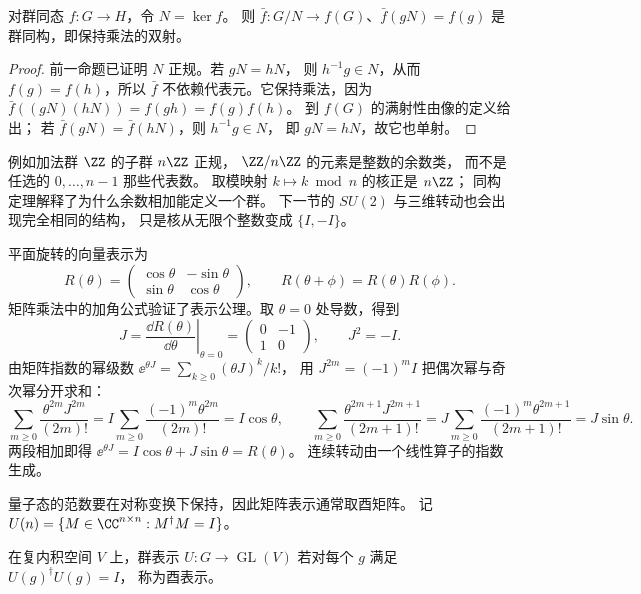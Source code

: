 \begin{theorem}[同态的第一同构定理]
对群同态 \(f:G\to H\)，令 \(N=\ker f\)。
则 \(\bar f:G/N\to f(G)\)、\(\bar f(gN)=f(g)\)
是群同构，即保持乘法的双射。
\end{theorem}
\begin{proof}
前一命题已证明 \(N\) 正规。若 \(gN=hN\)，
则 \(h^{-1}g\in N\)，从而 \(f(g)=f(h)\)，所以 \(\bar f\)
不依赖代表元。它保持乘法，因为
\(\bar f((gN)(hN))=f(gh)=f(g)f(h)\)。
到 \(f(G)\) 的满射性由像的定义给出；
若 \(\bar f(gN)=\bar f(hN)\)，则 \(h^{-1}g\in N\)，
即 \(gN=hN\)，故它也单射。
\end{proof}

例如加法群 \(\ZZ\) 的子群 \(n\ZZ\) 正规，
\(\ZZ/n\ZZ\) 的元素是整数的余数类，
而不是任选的 \(0,\ldots,n-1\) 那些代表数。
取模映射 \(k\mapsto k\bmod n\) 的核正是 \(n\ZZ\)；
同构定理解释了为什么余数相加能定义一个群。
下一节的 \(SU(2)\) 与三维转动也会出现完全相同的结构，
只是核从无限个整数变成 \(\{I,-I\}\)。

平面旋转的向量表示为
\[
R(\theta)=
\begin{pmatrix}\cos\theta&-\sin\theta\\
\sin\theta&\cos\theta\end{pmatrix},\qquad
R(\theta+\phi)=R(\theta)R(\phi).
\]
矩阵乘法中的加角公式验证了表示公理。取 \(\theta=0\) 处导数，得到
\[
J=\left.\frac{\dd R(\theta)}{\dd\theta}\right|_{\theta=0}
=\begin{pmatrix}0&-1\\1&0\end{pmatrix},\qquad J^2=-I.
\]
由矩阵指数的幂级数 \(\ee^{\theta J}=\sum_{k\ge0}(\theta J)^k/k!\)，
用 \(J^{2m}=(-1)^m I\) 把偶次幂与奇次幂分开求和：
\[
\sum_{m\ge0}\frac{\theta^{2m}J^{2m}}{(2m)!}
=I\sum_{m\ge0}\frac{(-1)^m\theta^{2m}}{(2m)!}=I\cos\theta,
\qquad
\sum_{m\ge0}\frac{\theta^{2m+1}J^{2m+1}}{(2m+1)!}
=J\sum_{m\ge0}\frac{(-1)^m\theta^{2m+1}}{(2m+1)!}=J\sin\theta.
\]
两段相加即得 \(\ee^{\theta J}=I\cos\theta+J\sin\theta=R(\theta)\)。
连续转动由一个线性算子的指数生成。

量子态的范数要在对称变换下保持，因此矩阵表示通常取酉矩阵。
记 \(U(n)=\{M\in\CC^{n\times n}:M^\dagger M=I\}\)。
\begin{definition}[有限维酉表示]
在复内积空间 \(V\) 上，群表示 \(U:G\to\operatorname{GL}(V)\)
若对每个 \(g\) 满足 \(U(g)^\dagger U(g)=I\)，
称为酉表示。
\end{definition}

